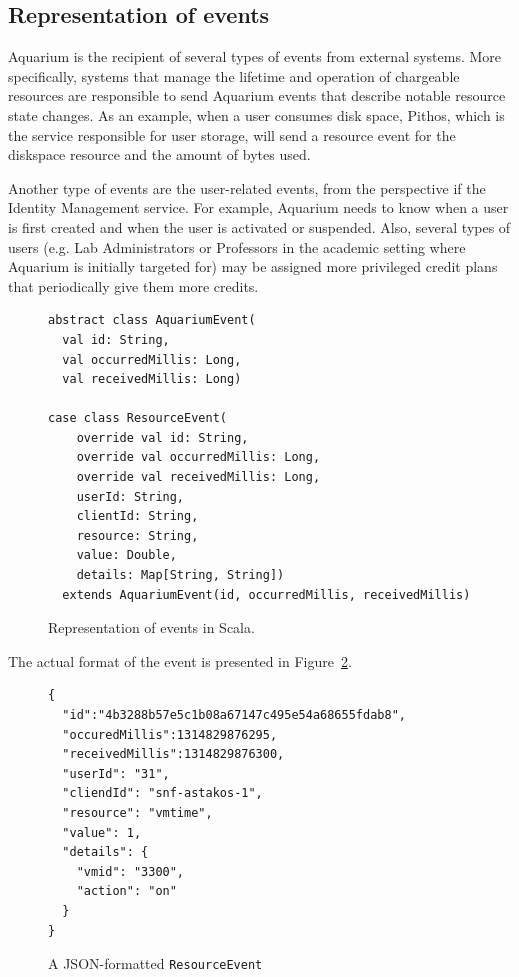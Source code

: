 \documentclass[preprint,10pt]{sigplanconf}
\begin{document}
\subsection{Representation of events}
Aquarium is the recipient of several types of events from external systems. More specifically, systems that manage the lifetime and operation of chargeable resources are responsible to send Aquarium events that describe notable resource state changes. As an example, when a user consumes disk space, Pithos, which is the service responsible for user storage, will send a resource event for the \textsf{diskspace} resource and the amount of bytes used.

Another type of events are the user-related events, from the perspective if the Identity Management service. For example, Aquarium needs to know when a user is first created and when the user is activated or suspended. Also, several types of users (e.g. Lab Administrators or Professors in the academic setting where Aquarium is initially targeted for) may be assigned more privileged credit plans that periodically give them more credits.

\begin{figure}
\lstset{language=c, basicstyle=\footnotesize,
stringstyle=\ttfamily, 
flexiblecolumns=true, aboveskip=-0.9em, belowskip=0em, lineskip=0em}

\begin{lstlisting}
abstract class AquariumEvent(
  val id: String,
  val occurredMillis: Long,
  val receivedMillis: Long)
  
case class ResourceEvent(
    override val id: String,
    override val occurredMillis: Long, 
    override val receivedMillis: Long, 
    userId: String,
    clientId: String,               
    resource: String,
    value: Double,
    details: Map[String, String])
  extends AquariumEvent(id, occurredMillis, receivedMillis)
\end{lstlisting}
\caption{Representation of events in Scala.}
\label{fig:aqevent}
\end{figure}

The actual format of the event is presented in Figure~\ref{fig:resevt}.

\begin{figure}
\lstset{language=C, basicstyle=\footnotesize,
stringstyle=\ttfamily, 
flexiblecolumns=true, aboveskip=-0.9em, belowskip=0em, lineskip=0em}

\begin{lstlisting}
{
  "id":"4b3288b57e5c1b08a67147c495e54a68655fdab8",
  "occuredMillis":1314829876295,
  "receivedMillis":1314829876300,
  "userId": "31",
  "cliendId": "snf-astakos-1",
  "resource": "vmtime",
  "value": 1,
  "details": {
    "vmid": "3300",
    "action": "on"
  }
}
\end{lstlisting}
\caption{A JSON-formatted \texttt{ResourceEvent}} 
\label{fig:resevt}
\end{figure}
\end{document}
